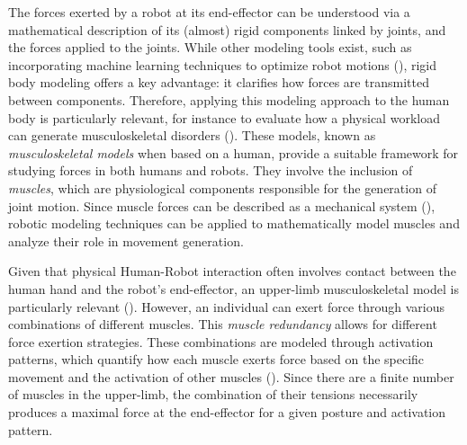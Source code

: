 The forces exerted by a robot at its end-effector can be understood via a mathematical description of its (almost) rigid components linked by joints, and the forces applied to the joints. While other modeling tools exist, such as incorporating machine learning techniques to optimize robot motions (\cite{peternelAdaptationRobotPhysical2016}), rigid body modeling offers a key advantage: it clarifies how forces are transmitted between components. Therefore, applying this modeling approach to the human body is particularly relevant, for instance to evaluate how a physical workload can generate musculoskeletal disorders (\cite{hoozemansMechanicalLoadingLow2004}). These models, known as \emph{musculoskeletal models} when based on a human, provide a suitable framework for studying forces in both humans and robots. They involve the inclusion of \emph{muscles}, which are physiological components responsible for the generation of joint motion. Since muscle forces can be described as a mechanical system (\cite{hillHeatShorteningDynamic1938}), robotic modeling techniques can be applied to mathematically model muscles and analyze their role in movement generation.

Given that physical Human-Robot interaction often involves contact between the human hand and the robot's end-effector, an upper-limb musculoskeletal model is particularly relevant (\cite{holzbaurModelUpperExtremity2005}). However, an individual can exert force through various combinations of different muscles. This \emph{muscle redundancy} allows for different force exertion strategies. These combinations are modeled through activation patterns, which quantify how each muscle exerts force based on the specific movement and the activation of other muscles (\cite{zajacMuscleTendonProperties1989a}). Since there are a finite number of muscles in the upper-limb, the combination of their tensions necessarily produces a maximal force at the end-effector for a given posture and activation pattern.

